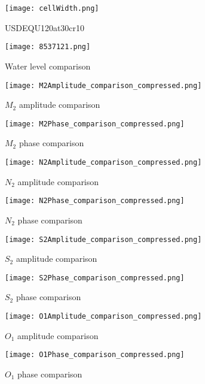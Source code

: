 \documentclass[11pt]{report}
\begin{document}
\begin{figure}
    \centering
    \texttt{[image: cellWidth.png]}
    \caption{USDEQU120at30cr10}
    \label{fig:mesh}
\end{figure}
\begin{figure}
    \centering
    \texttt{[image: 8537121.png]}
    \caption{Water level comparison}
    \label{fig:water_level}
\end{figure}
\begin{figure}
    \begin{minipage}{.5\textwidth}
    \centering
    \texttt{[image: M2Amplitude\_comparison\_compressed.png]}
    \caption{$M_2$ amplitude comparison}
    \label{fig:M2Amplitude}
    \end{minipage}
    \begin{minipage}{.5\textwidth}
    \centering
    \texttt{[image: M2Phase\_comparison\_compressed.png]}
    \caption{$M_2$ phase comparison}
    \label{fig:M2Phase}
    \end{minipage}
\end{figure}
\begin{figure}
    \begin{minipage}{.5\textwidth}
    \centering
    \texttt{[image: N2Amplitude\_comparison\_compressed.png]}
    \caption{$N_2$ amplitude comparison}
    \label{fig:N2Amplitude}
    \end{minipage}
    \begin{minipage}{.5\textwidth}
    \centering
    \texttt{[image: N2Phase\_comparison\_compressed.png]}
    \caption{$N_2$ phase comparison}
    \label{fig:N2Phase}
    \end{minipage}
\end{figure}
\begin{figure}
    \begin{minipage}{.5\textwidth}
    \centering
    \texttt{[image: S2Amplitude\_comparison\_compressed.png]}
    \caption{$S_2$ amplitude comparison}
    \label{fig:S2Amplitude}
    \end{minipage}
    \begin{minipage}{.5\textwidth}
    \centering
    \texttt{[image: S2Phase\_comparison\_compressed.png]}
    \caption{$S_2$ phase comparison}
    \label{fig:S2Phase}
    \end{minipage}
\end{figure}
\begin{figure}
    \begin{minipage}{.5\textwidth}
    \centering
    \texttt{[image: O1Amplitude\_comparison\_compressed.png]}
    \caption{$O_1$ amplitude comparison}
    \label{fig:O1Amplitude}
    \end{minipage}
    \begin{minipage}{.5\textwidth}
    \centering
    \texttt{[image: O1Phase\_comparison\_compressed.png]}
    \caption{$O_1$ phase comparison}
    \label{fig:O1Phase}
    \end{minipage}
\end{figure}
\end{document}
